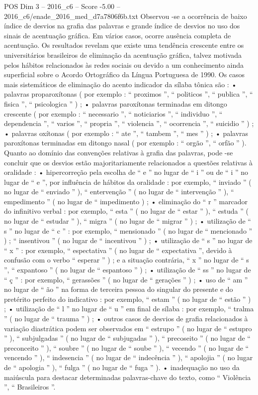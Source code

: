 \begin{textsample}{POS Dim 3 – 2016\_c6 – Score -5.00 – 2016\_c6/enade\_2016\_med\_d7a7806f6b.txt}
Observou -se a ocorrência de baixo índice de desvios na grafia das palavras e grande índice de desvios no uso dos sinais de acentuação gráfica.
Em vários casos, ocorre ausência completa de acentuação.
Os resultados revelam que existe uma tendência crescente entre os universitários brasileiros de eliminação da acentuação gráfica, talvez motivada pelos hábitos relacionados às redes sociais ou devido a um conhecimento ainda superficial sobre o Acordo Ortográfico da Língua Portuguesa de 1990.
Os casos mais sistemáticos de eliminação do acento indicador da sílaba tônica são : • palavras proparoxítonas ( por exemplo : “ proximos ”, “ politicos ”, “ publica ”, “ fisica ”, “ psicologica ” ) ; • palavras paroxítonas terminadas em ditongo crescente ( por exemplo : “ necessario ”, “ noticiarios ”, “ individuo ”, “ dependencia ”, “ varios ”, “ propria ”, “ violencia ”, “ ocorrencia ”, “ suicidio ” ) ; • palavras oxítonas ( por exemplo : “ ate ”, “ tambem ”, “ mes ” ) ; • palavras paroxítonas terminadas em ditongo nasal ( por exemplo : “ orgão ”, “ orfão ” ).
Quanto ao domínio das convenções relativas à grafia das palavras, pode -se concluir que os desvios estão majoritariamente relacionados a questões relativas à oralidade : • hipercorreção pela escolha de “ e ” no lugar de “ i ” ou de “ i ” no lugar de “ e ”, por influência de hábitos da oralidade : por exemplo, “ inviado ” ( no lugar de “ enviado ” ), “ entervenção ” ( no lugar de “ intervenção ” ), “ empedimento ” ( no lugar de “ impedimento ) ; • eliminação do “ r ” marcador do infinitivo verbal : por exemplo, “ esta ” ( no lugar de “ estar ” ), “ estuda ” ( no lugar de “ estudar ” ), “ migra ” ( no lugar de “ migrar ” ) ; • utilização de “ s ” no lugar de “ c ” : por exemplo, “ mensionado ” ( no lugar de “ mencionado ” ) ; “ insentivou ” ( no lugar de “ incentivou ” ) ; • utilização de “ s ” no lugar de “ x ” : por exemplo, “ espectativa ” ( no lugar de “ expectativa ”, devido à confusão com o verbo “ esperar ” ) ; e a situação contrária, “ x ” no lugar de “ s ”, “ expantoso ” ( no lugar de “ espantoso ” ) ; • utilização de “ ss ” no lugar de “ ç ” : por exemplo, “ gerassões ” ( no lugar de “ gerações ” ) ; • uso de “ am ” no lugar de “ ão ” na forma de terceira pessoa do singular do presente e do pretérito perfeito do indicativo : por exemplo, “ estam ” ( no lugar de “ estão ” ) ; • utilização de “ l ” no lugar de “ u ” em final de sílaba : por exemplo, “ tralma ” ( no lugar de “ trauma ” ) ; • outros casos de desvios de grafia relacionados à variação diastrática podem ser observados em “ estrupo ” ( no lugar de “ estupro ” ), “ subjulgadas ” ( no lugar de “ subjugadas ” ), “ precoseito ” ( no lugar de “ preconceito ” ), “ soubre ” ( no lugar de “ soube ” ), “ vecendo ” ( no lugar de “ vencendo ” ), “ indesencia ” ( no lugar de “ indecência ” ), “ apolojia ” ( no lugar de “ apologia ” ), “ fulga ” ( no lugar de “ fuga ” ). • inadequação no uso da maiúscula para destacar determinadas palavras-chave do texto, como “ Violência ”, “ Brasileiros ”.

\end{textsample}
